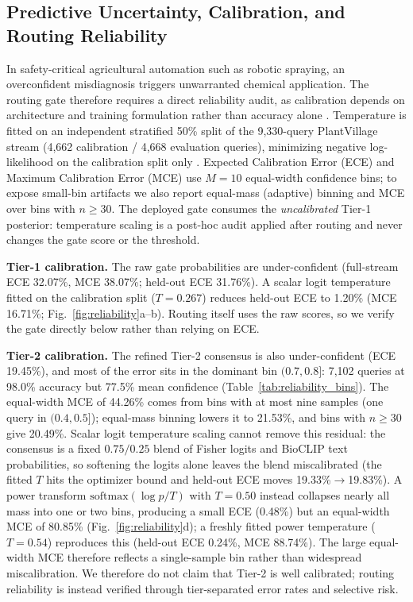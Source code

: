 \documentclass[preprint,12pt]{elsarticle}
\begin{document}
\subsection{Predictive Uncertainty, Calibration, and Routing Reliability}
\label{sec:calibration}
In safety-critical agricultural automation such as robotic spraying, an overconfident misdiagnosis triggers unwarranted chemical application. The routing gate therefore requires a direct reliability audit, as calibration depends on architecture and training formulation rather than accuracy alone \cite{minderer2021revisiting}. Temperature is fitted on an independent stratified 50\% split of the 9,330-query PlantVillage stream (4,662 calibration / 4,668 evaluation queries), minimizing negative log-likelihood on the calibration split only \cite{guo2017calibration}. Expected Calibration Error (ECE) and Maximum Calibration Error (MCE) use $M=10$ equal-width confidence bins; to expose small-bin artifacts we also report equal-mass (adaptive) binning and MCE over bins with $n \geq 30$. The deployed gate consumes the \emph{uncalibrated} Tier-1 posterior: temperature scaling is a post-hoc audit applied after routing and never changes the gate score or the threshold.

\textbf{Tier-1 calibration.} The raw gate probabilities are under-confident (full-stream ECE 32.07\%, MCE 38.07\%; held-out ECE 31.76\%). A scalar logit temperature fitted on the calibration split ($T=0.267$) reduces held-out ECE to 1.20\% (MCE 16.71\%; Fig.~\ref{fig:reliability}a--b). Routing itself uses the raw scores, so we verify the gate directly below rather than relying on ECE.

\textbf{Tier-2 calibration.} The refined Tier-2 consensus is also under-confident (ECE 19.45\%), and most of the error sits in the dominant bin $(0.7,0.8]$: 7,102 queries at 98.0\% accuracy but 77.5\% mean confidence (Table~\ref{tab:reliability_bins}). The equal-width MCE of 44.26\% comes from bins with at most nine samples (one query in $(0.4,0.5]$); equal-mass binning lowers it to 21.53\%, and bins with $n\geq30$ give 20.49\%. Scalar logit temperature scaling cannot remove this residual: the consensus is a fixed $0.75/0.25$ blend of Fisher logits and BioCLIP text probabilities, so softening the logits alone leaves the blend miscalibrated (the fitted $T$ hits the optimizer bound and held-out ECE moves 19.33\%$\to$19.83\%). A power transform $\mathrm{softmax}(\log p / T)$ with $T=0.50$ instead collapses nearly all mass into one or two bins, producing a small ECE (0.48\%) but an equal-width MCE of 80.85\% (Fig.~\ref{fig:reliability}d); a freshly fitted power temperature ($T=0.54$) reproduces this (held-out ECE 0.24\%, MCE 88.74\%). The large equal-width MCE therefore reflects a single-sample bin rather than widespread miscalibration. We therefore do not claim that Tier-2 is well calibrated; routing reliability is instead verified through tier-separated error rates and selective risk.
\end{document}
